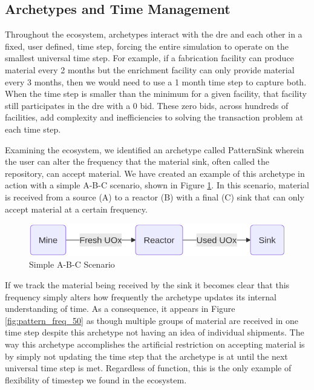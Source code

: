 

\subsection{Archetypes and Time Management}
\label{sec:archetypes_and_time_management}

Throughout the \cyclus ecosystem, archetypes interact with the \gls{dre} and each other in a fixed, user defined, time step, forcing the entire simulation to operate on the smallest universal time step. For example, if a fabrication facility can produce material every 2 months but the enrichment facility can only provide material every 3 months, then we would need to use a 1 month time step to capture both. When the time step is smaller than the minimum for a given facility, that facility still participates in the \gls{dre} with a 0 bid. These zero bids, across hundreds of facilities, add complexity and inefficiencies to solving the transaction problem at each time step.

Examining the \cyclus ecosystem, we identified an archetype called PatternSink wherein the user can alter the frequency that the material sink, often called the repository, can accept material. We have created an example of this archetype in action with a simple A-B-C scenario, shown in Figure \ref{fig:a-b-c}. In this scenario, material is received from a source (A) to a reactor (B) with a final (C) sink that can only accept material at a certain frequency.

\begin{figure}[!ht]
    \centering
    \includegraphics[scale=0.4]{images/cyclus/a-b-c.png}
    \caption{Simple A-B-C Scenario}
    \label{fig:a-b-c}
\end{figure}

If we track the material being received by the sink it becomes clear that this frequency simply alters how frequently the archetype updates its internal understanding of time. As a consequence, it appears in Figure \ref{fig:pattern_freq_50} as though multiple groups of material are received in one time step despite this archetype not having an idea of individual shipments. The way this archetype accomplishes the artificial restriction on accepting material is by simply not updating the time step that the archetype is at until the next universal time step is met. Regardless of function, this is the only example of flexibility of timestep we found in the ecosystem.

